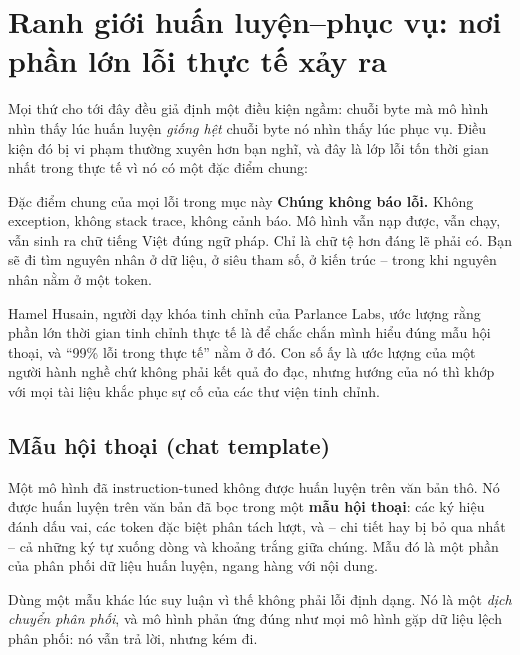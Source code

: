 
\section{Ranh giới huấn luyện--phục vụ: nơi phần lớn lỗi thực tế xảy ra}
\label{sec:train_serve_boundary}

Mọi thứ cho tới đây đều giả định một điều kiện ngầm: chuỗi byte mà mô hình nhìn thấy lúc huấn luyện \emph{giống hệt} chuỗi byte nó nhìn thấy lúc phục vụ. Điều kiện đó bị vi phạm thường xuyên hơn bạn nghĩ, và đây là lớp lỗi tốn thời gian nhất trong thực tế vì nó có một đặc điểm chung:

\begin{pitfall}{Đặc điểm chung của mọi lỗi trong mục này}
\textbf{Chúng không báo lỗi.} Không exception, không stack trace, không cảnh báo. Mô hình vẫn nạp được, vẫn chạy, vẫn sinh ra chữ tiếng Việt đúng ngữ pháp. Chỉ là chữ tệ hơn đáng lẽ phải có. Bạn sẽ đi tìm nguyên nhân ở dữ liệu, ở siêu tham số, ở kiến trúc -- trong khi nguyên nhân nằm ở một token.
\end{pitfall}

\noindent Hamel Husain, người dạy khóa tinh chỉnh của Parlance Labs, ước lượng rằng phần lớn thời gian tinh chỉnh thực tế là để chắc chắn mình hiểu đúng mẫu hội thoại, và “99\% lỗi trong thực tế” nằm ở đó. Con số ấy là ước lượng của một người hành nghề chứ không phải kết quả đo đạc, nhưng hướng của nó thì khớp với mọi tài liệu khắc phục sự cố của các thư viện tinh chỉnh.

\subsection{Mẫu hội thoại (chat template)}
\label{ssec:chat_template}

Một mô hình đã instruction-tuned không được huấn luyện trên văn bản thô. Nó được huấn luyện trên văn bản đã bọc trong một \textbf{mẫu hội thoại}: các ký hiệu đánh dấu vai, các token đặc biệt phân tách lượt, và -- chi tiết hay bị bỏ qua nhất -- cả những ký tự xuống dòng và khoảng trắng giữa chúng. Mẫu đó là một phần của phân phối dữ liệu huấn luyện, ngang hàng với nội dung.

Dùng một mẫu khác lúc suy luận vì thế không phải lỗi định dạng. Nó là một \emph{dịch chuyển phân phối}, và mô hình phản ứng đúng như mọi mô hình gặp dữ liệu lệch phân phối: nó vẫn trả lời, nhưng kém đi.

